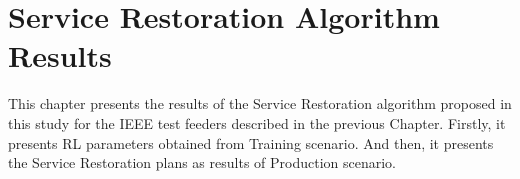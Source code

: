 \chapter{Service Restoration Algorithm Results}
\label{ch3}
This chapter presents the results of the Service Restoration algorithm proposed in this study 
for the IEEE test feeders described in the previous Chapter. 
Firstly, it presents RL parameters obtained from Training scenario. And then, it presents the 
Service Restoration plans as results of Production scenario. 



